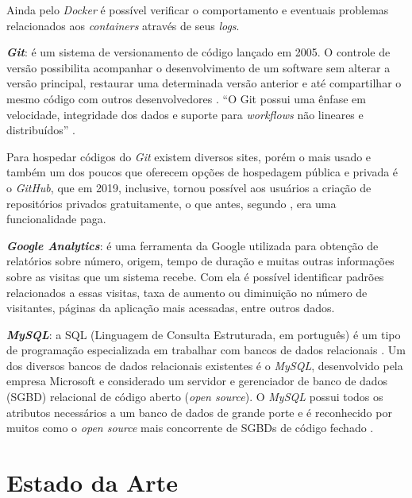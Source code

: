 Ainda pelo \textit{Docker} é possível verificar o comportamento e eventuais problemas relacionados aos \textit{containers} através de seus \textit{logs}.

\textbf{\textit{Git}}: é um sistema de versionamento de código lançado em 2005. O controle de versão possibilita acompanhar o desenvolvimento de um
software sem alterar a versão principal, restaurar uma determinada versão anterior e até compartilhar o mesmo código com outros desenvolvedores \cite{palestinoestudo}. ``O Git possui uma ênfase em velocidade, integridade dos dados e suporte para \textit{workflows} não lineares e distribuídos'' \cite[p. 10]{ghezzi2015api}.

Para hospedar códigos do \textit{Git} existem diversos sites, porém o mais usado e também um dos poucos que oferecem opções de hospedagem pública e privada é o \textit{GitHub}, que em 2019, inclusive, tornou possível aos usuários a criação de repositórios privados gratuitamente, o que antes, segundo , era uma funcionalidade paga. 

\textbf{\textit{Google Analytics}}: é uma ferramenta da Google utilizada para obtenção de relatórios sobre número, origem, tempo de duração e muitas outras informações sobre as visitas que um sistema recebe. Com ela é possível identificar padrões relacionados a essas visitas, taxa de aumento ou diminuição no número de visitantes, páginas da aplicação mais acessadas, entre outros dados. 

\textbf{\textit{MySQL}}: a SQL (Linguagem de Consulta Estruturada, em português) é um tipo de programação especializada em trabalhar com bancos de dados relacionais \cite[~p. 7, tradução nossa]{mysql2001mysql}. Um dos diversos bancos de dados relacionais existentes é o \textit{MySQL}, desenvolvido pela empresa Microsoft e considerado um servidor e gerenciador de banco de dados (SGBD) relacional de código aberto (\textit{open source}). O \textit{MySQL} possui todos os atributos necessários a um banco de dados de grande porte e é reconhecido por muitos como o \textit{open source} mais concorrente de SGBDs de código fechado \cite{milani2007mysql}.


\hspace{2.5cm}

\hspace{2.5cm}
\section{Estado da Arte}
\label{sec:trabalhoscorrelatos}
\hspace{2.5cm}

